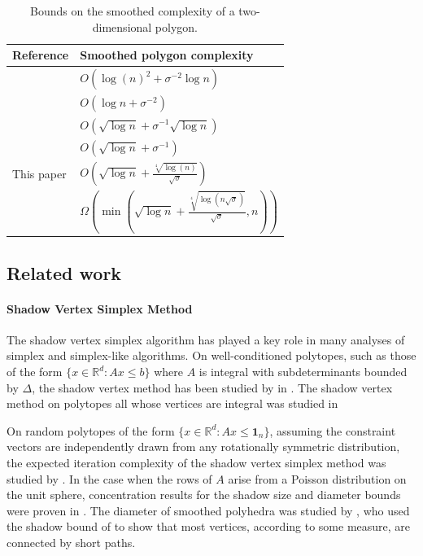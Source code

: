 \documentclass{theoretics}
\newcommand{\R}{\mathbb R}
\begin{document}
\begin{table}[h!]
  \begin{center}
  \renewcommand{\arraystretch}{1.6}
    \begin{tabular}{|l|l|}
        \hline
        {\bf Reference} & {\bf Smoothed polygon complexity} \\
        \hline
        \cite{damerow2004extreme} & $O(\log(n)^2 + \sigma^{-2}\log n)$ \\
        \hline
        \cite{thesis/Schnalzger14} & $O(\log n + \sigma^{-2})$ \\
        \hline
        \cite{DGGT16} & $O(\sqrt{\log n} + \sigma^{-1}\sqrt{\log n})$ \\
        \hline
        \cite{bwcachapter} & $O(\sqrt{\log n} + \sigma^{-1})$ \\
        \hline
        This paper & $O(\sqrt{\log n} + \frac{\sqrt[4]{\log (n)}}{\sqrt{\sigma}})$ \\
        \hline
        \hline
        \cite{DGGT16} & $\Omega(\min(\sqrt{\log n} + \frac{\sqrt[4]{\log (n\sqrt\sigma)}}{\sqrt{\sigma}},n))$ \\
        \hline
    \end{tabular}
    \caption{Bounds on the smoothed complexity of a two-dimensional polygon.}\label{tab:twod_history}
  \end{center}
\end{table}

\subsection{Related work}
\paragraph{Shadow Vertex Simplex Method}

The shadow vertex simplex algorithm has played a key role in many analyses of simplex and simplex-like algorithms.
On well-conditioned polytopes, such as those of the form $\{x \in \R^d : Ax \leq b\}$ where $A$
is integral with subdeterminants bounded by $\Delta$, the shadow vertex method has been studied
by in \cite{conf/icalp/BR13, jour/dcg/DH16}.
The shadow vertex method on polytopes all whose vertices are integral was studied in \cite{simplexzeroone,black22}

On random polytopes of the form $\{x \in \R^d : Ax \leq \mathbf 1_n\}$, assuming the
constraint vectors are independently drawn from any rotationally symmetric distribution, the
expected iteration complexity of the shadow vertex simplex method was studied by \cite{b82, b87, b99}.
In the case when the rows of $A$ arise from a Poisson distribution on the unit sphere,
concentration results for the shadow size and diameter bounds were proven in \cite{bdghl21}.
The diameter of smoothed polyhedra was studied by \cite{narayanan2021spectral}, who used the shadow bound of \cite{DH18}
to show that most vertices, according to some measure, are connected by short paths.
\end{document}
